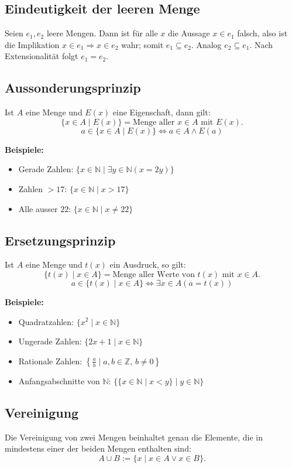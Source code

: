 \documentclass[10pt,landscape]{article}
\begin{document}
\begin{multicols*}{4}
\subsection{Eindeutigkeit der leeren Menge}
Seien \(e_1,e_2\) leere Mengen. Dann ist für alle \(x\) die Aussage \(x\in e_1\) falsch, also ist die Implikation \(x\in e_1\Rightarrow x\in e_2\) wahr; somit \(e_1\subseteq e_2\). Analog \(e_2\subseteq e_1\). Nach Extensionalität folgt \(e_1=e_2\).


\subsection{Aussonderungsprinzip}
Ist \(A\) eine Menge und \(E(x)\) eine Eigenschaft, dann gilt:
\[
\{x \in A \mid E(x)\} = \text{Menge aller } x \in A \text{ mit } E(x).
\]
\[
a \in \{x \in A \mid E(x)\} \iff a \in A \land E(a)
\]

\textbf{Beispiele:}
\begin{itemize}
  \item Gerade Zahlen: \(\{x \in \mathbb{N} \mid \exists y \in \mathbb{N} (x = 2y)\}\)
  \item Zahlen \(> 17\): \(\{x \in \mathbb{N} \mid x > 17\}\)
  \item Alle ausser \(22\): \(\{x \in \mathbb{N} \mid x \neq 22\}\)
\end{itemize}

\subsection{Ersetzungsprinzip}
Ist \(A\) eine Menge und \(t(x)\) ein Ausdruck, so gilt:
\[ \{t(x) \mid x \in A\} = \text{Menge aller Werte von } t(x) \text{ mit } x \in A. \]
\[ a \in \{t(x) \mid x \in A\} \iff \exists x \in A (a = t(x)) \]

\textbf{Beispiele:}
\begin{itemize}
  \item Quadratzahlen: \(\{x^2 \mid x \in \mathbb{N}\}\)
  \item Ungerade Zahlen: \(\{2x + 1 \mid x \in \mathbb{N}\}\)
  \item Rationale Zahlen: \(\left\{\frac{a}{b} \mid a,b \in \mathbb{Z},\, b \neq 0\right\}\)
  \item Anfangsabschnitte von \(\mathbb{N}\): \(\{\{x \in \mathbb{N} \mid x < y\} \mid y \in \mathbb{N}\}\)
\end{itemize}




\subsection{Vereinigung}
Die Vereinigung von zwei Mengen beinhaltet genau die Elemente, die in mindestens einer der beiden Mengen enthalten sind:
\[
A\cup B:=\{x\mid x\in A\vee x\in B\}.
\]


\end{multicols*}
\end{document}
